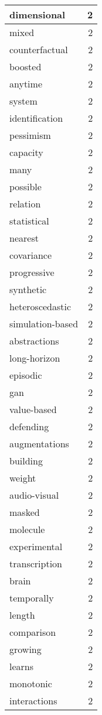 \begin{table}[h]
\begin{tabular}{|l|r|}
\hline
dimensional & 2 \\
\hline
mixed & 2 \\
\hline
counterfactual & 2 \\
\hline
boosted & 2 \\
\hline
anytime & 2 \\
\hline
system & 2 \\
\hline
identification & 2 \\
\hline
pessimism & 2 \\
\hline
capacity & 2 \\
\hline
many & 2 \\
\hline
possible & 2 \\
\hline
relation & 2 \\
\hline
statistical & 2 \\
\hline
nearest & 2 \\
\hline
covariance & 2 \\
\hline
progressive & 2 \\
\hline
synthetic & 2 \\
\hline
heteroscedastic & 2 \\
\hline
simulation-based & 2 \\
\hline
abstractions & 2 \\
\hline
long-horizon & 2 \\
\hline
episodic & 2 \\
\hline
gan & 2 \\
\hline
value-based & 2 \\
\hline
defending & 2 \\
\hline
augmentations & 2 \\
\hline
building & 2 \\
\hline
weight & 2 \\
\hline
audio-visual & 2 \\
\hline
masked & 2 \\
\hline
molecule & 2 \\
\hline
experimental & 2 \\
\hline
transcription & 2 \\
\hline
brain & 2 \\
\hline
temporally & 2 \\
\hline
length & 2 \\
\hline
comparison & 2 \\
\hline
growing & 2 \\
\hline
learns & 2 \\
\hline
monotonic & 2 \\
\hline
interactions & 2 \\

\end{tabular}
\end{table}
